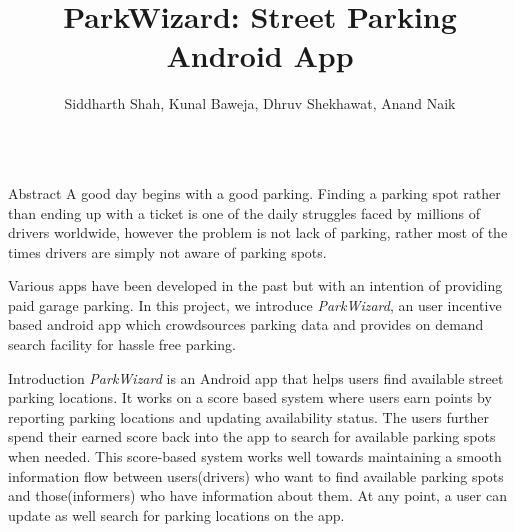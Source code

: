 \documentclass[final]{beamer}
\title{ParkWizard: Street Parking Android App} %
\author{Siddharth Shah, Kunal Baweja, Dhruv Shekhawat, Anand Naik} %
\newlength{\onecolwid}
\begin{document}


\begin{frame}[t] %

\begin{columns}[t] %

\begin{column}{\onecolwid} %

\begin{alertblock}{Abstract}
A good day begins with a good parking. Finding a parking spot rather than ending up with a ticket is one of the daily struggles faced by millions of drivers worldwide, however the problem is not lack of parking, rather most of the times drivers are simply not aware of parking spots.\par
Various apps have been developed in the past but with an intention of providing paid garage parking. In this project, we introduce \textit{ParkWizard}, an user incentive based android app which crowdsources parking data and provides on demand search facility for hassle free parking.
\end{alertblock}


\begin{block}{Introduction}
\textit{ParkWizard} is an Android app that helps users find available street parking locations. It works on a score based system where users earn points by reporting parking locations and updating availability status. The users further spend their earned score back into the app to search for available parking spots when needed. This score-based system works well towards maintaining a smooth information flow between users(drivers) who want to find available parking spots and those(informers) who have information about them. At any point, a user can update as well search for parking locations on the app.\par
\end{block}


\end{column}
\end{columns}
\end{frame}
\end{document}
